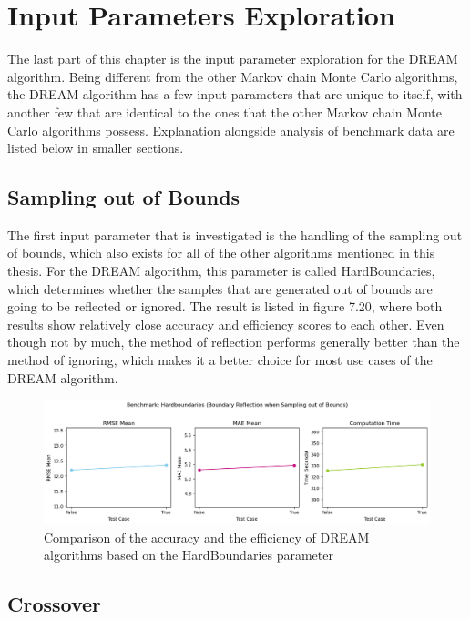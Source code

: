 \section{Input Parameters Exploration}
The last part of this chapter is the input parameter exploration for the DREAM algorithm. Being different from the other Markov chain Monte Carlo algorithms, the DREAM algorithm has a few input parameters that are unique to itself, with another few that are identical to the ones that the other Markov chain Monte Carlo algorithms possess. Explanation alongside analysis of benchmark data are listed below in smaller sections. 

\subsection{Sampling out of Bounds}
The first input parameter that is investigated is the handling of the sampling out of bounds, which also exists for all of the other algorithms mentioned in this thesis. For the DREAM algorithm, this parameter is called HardBoundaries, which determines whether the samples that are generated out of bounds are going to be reflected or ignored. The result is listed in figure 7.20, where both results show relatively close accuracy and efficiency scores to each other. Even though not by much, the method of reflection performs generally better than the method of ignoring, which makes it a better choice for most use cases of the DREAM algorithm.

\begin{figure}[H]
    \centering
    \includegraphics[width=1\textwidth]{figures/dream/sotb.png}
    \captionsetup{width=.8\textwidth}
    \caption{Comparison of the accuracy and the efficiency of DREAM algorithms based on the HardBoundaries parameter}
    \label{fig:enter-label}
\end{figure}

\subsection{Crossover}

